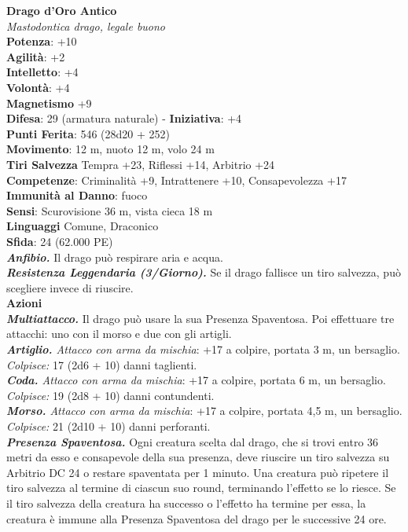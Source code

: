 \begin{multicols}{2}
\medskip\textbf{Drago d'Oro Antico}\\
\emph{Mastodontica drago, legale buono}\\
\textbf{Potenza}: +10\\
\textbf{Agilità}: +2\\
\textbf{Intelletto}: +4\\
\textbf{Volontà}: +4\\
\textbf{Magnetismo} +9\\
\textbf{Difesa}: 29 (armatura naturale) - \textbf{Iniziativa}: +4\\
\textbf{Punti Ferita}: 546 (28d20 + 252) \\
\textbf{Movimento}: 12 m, nuoto 12 m, volo 24 m\\
\textbf{Tiri Salvezza} Tempra +23, Riflessi +14, Arbitrio +24\\
\textbf{Competenze}: Criminalità +9, Intrattenere +10, Consapevolezza +17\\
\textbf{Immunità al Danno}: fuoco\\
\textbf{Sensi}: Scurovisione 36 m, vista cieca 18 m\\
\textbf{Linguaggi} Comune, Draconico\\
\textbf{Sfida}: 24 (62.000 PE)\smallskip\\
\emph{\textbf{Anfibio.}} Il drago può respirare aria e acqua.\\
\emph{\textbf{Resistenza Leggendaria (3/Giorno).}} Se il drago fallisce un tiro salvezza, può scegliere invece di riuscire.\\
\smallskip\textbf{Azioni}\\
\emph{\textbf{Multiattacco.}} Il drago può usare la sua Presenza Spaventosa. Poi effettuare tre attacchi: uno con il morso e due con gli artigli.\\
\emph{\textbf{Artiglio.} Attacco con arma da mischia}: +17 a colpire, portata 3 m, un bersaglio.\\
\emph{Colpisce:} 17 (2d6 + 10) danni taglienti.\\
\emph{\textbf{Coda.} Attacco con arma da mischia}: +17 a colpire, portata 6 m, un bersaglio.\\
\emph{Colpisce:} 19 (2d8 + 10) danni contundenti.\\
\emph{\textbf{Morso.} Attacco con arma da mischia}: +17 a colpire, portata 4,5 m, un bersaglio.\\
\emph{Colpisce:} 21 (2d10 + 10) danni perforanti.\\
\emph{\textbf{Presenza Spaventosa.}} Ogni creatura scelta dal drago, che si trovi entro 36 metri da esso e consapevole della sua presenza, deve riuscire un tiro salvezza su Arbitrio DC 24 o restare spaventata per 1 minuto. Una creatura può ripetere il tiro salvezza al termine di ciascun suo round, terminando l'effetto se lo riesce. Se il tiro salvezza della creatura ha successo o l'effetto ha termine per essa, la creatura è immune alla Presenza Spaventosa del drago per le successive 24 ore. \\

\end{multicols}
